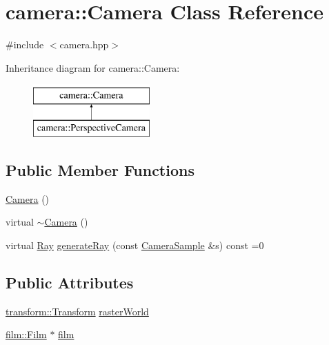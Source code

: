 \hypertarget{classcamera_1_1Camera}{}\section{camera\+::Camera Class Reference}
\label{classcamera_1_1Camera}


{\ttfamily \#include $<$camera.\+hpp$>$}

Inheritance diagram for camera\+::Camera\+:\begin{figure}[H]
\begin{center}
\leavevmode
\includegraphics[height=2.000000cm]{classcamera_1_1Camera}
\end{center}
\end{figure}
\subsection*{Public Member Functions}
\begin{DoxyCompactItemize}
\item 
\mbox{\hyperlink{classcamera_1_1Camera_acb85cee9b6ea6dfe86143e7446aca6bf}{Camera}} ()
\item 
virtual \mbox{\hyperlink{classcamera_1_1Camera_a51ce7c4d6738de1b4ae3362d9c8acd8e}{$\sim$\+Camera}} ()
\item 
virtual \mbox{\hyperlink{classRay}{Ray}} \mbox{\hyperlink{classcamera_1_1Camera_ac8029a1623243615089d0847cdf49585}{generate\+Ray}} (const \mbox{\hyperlink{structcamera_1_1CameraSample}{Camera\+Sample}} \&s) const =0
\end{DoxyCompactItemize}
\subsection*{Public Attributes}
\begin{DoxyCompactItemize}
\item 
\mbox{\hyperlink{classtransform_1_1Transform}{transform\+::\+Transform}} \mbox{\hyperlink{classcamera_1_1Camera_a1636f047c45d5960e80796e5f0b2ee89}{raster\+World}}
\item 
\mbox{\hyperlink{classfilm_1_1Film}{film\+::\+Film}} $\ast$ \mbox{\hyperlink{classcamera_1_1Camera_a1a21f72f5fae2d27aa020ceac7ce3bac}{film}}
\end{DoxyCompactItemize}


